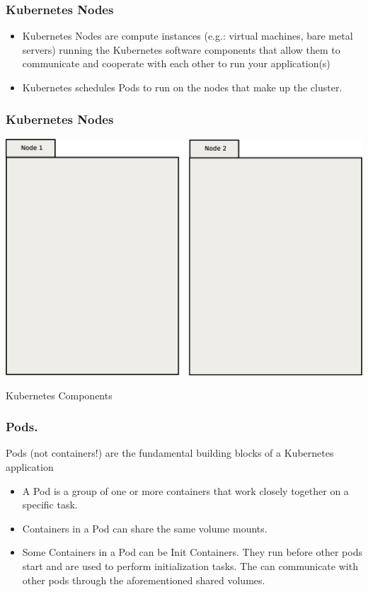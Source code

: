\documentclass{beamer}
\begin{document}
\begin{frame}
\frametitle{Kubernetes Nodes}
\begin{itemize}
\item Kubernetes Nodes are compute instances (e.g.: virtual machines, bare metal servers) running the Kubernetes software components that allow them to communicate and cooperate with each other to run your application(s)
\item Kubernetes schedules Pods to run on the nodes that make up the cluster.
\end{itemize}
\end{frame}

\begin{frame}
    \frametitle{Kubernetes Nodes}
    \includegraphics[width=\textwidth,height=\textheight,keepaspectratio]{graphics/00-nodes.eps}
\end{frame}

\begin{frame}
\begin{center}
\Huge Kubernetes Components
\end{center}
\end{frame}

\begin{frame}
\frametitle{Pods.}
Pods (not containers!) are the fundamental building blocks of a Kubernetes application
\begin{itemize}
    \item A Pod is a group of one or more containers that work closely together on a specific task.
    \item Containers in a Pod can share the same volume mounts.
    \item Some Containers in a Pod can be Init Containers. They run before other pods start and are used to perform initialization tasks. The can communicate with other pods through the aforementioned shared volumes.
\end{itemize}
\end{frame}
\end{document}
